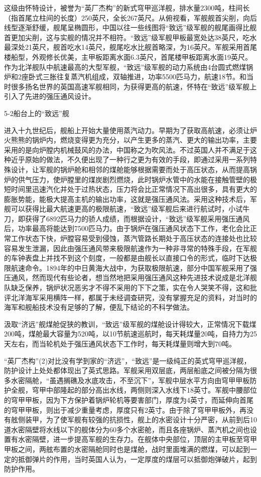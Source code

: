 \documentclass[12pt,UTF8]{ctexbook}
\begin{document}
这级由怀特设计，被誉为“英厂杰构”的新式穹甲巡洋舰，排水量2300吨，柱间长（指首尾立柱间的长度）250英尺，全长267英尺。从俯视看，军舰舰首尖削，向后线型逐渐舒缓，舰尾呈椭圆形，中国以往一些线图将“致远”级军舰的舰尾画得比舰首更加尖削，这与实舰的情况并不相符。“致远”级军舰甲板最宽处达38英尺，吃水最深处21英尺，舰首吃水14英尺，舰尾吃水比舰首略深，为16英尺。军舰采用首尾楼船型，外观修长优美，主甲板距离水面6.3英尺，首尾楼甲板距离水面19英尺。作为北洋舰队中航速最高的大型军舰，“致远”级军舰的动力系统由4台圆式燃煤锅炉和2座卧式三胀往复蒸汽机组成，双轴推进，功率5500匹马力，航速18节。和当时很多扬名世界的英国高速军舰相同，为获得更高的航速，怀特在“致远”级军舰上引入了先进的强压通风设计。

5-2船台上的“致远”舰

进入十九世纪后，舰船上开始大量使用蒸汽动力。早期为了获取高航速，必须让炉火熊熊的锅炉内，燃烧变得更为充分，以产生更多的蒸汽、更大的输出功率，主要采用的是向炉膛内机械鼓风的办法，中国称之为吹风法。不过英国人并不满足于这种近乎原始的做法，不久便出现了一种行之更为有效的手段，即通过采用一系列特殊设计，让军舰的锅炉舱和相邻的煤舱能够根据需要而处于高压状态，从而提高锅炉的供气压力，使炉膛里的煤炭剧烈燃烧，此时锅炉水管中的水能在接触管壁的极短时间里迅速汽化并处于过热状态，压力将会比正常情况下高出很多，具有更大的膨胀势能，能极大提高主机的输出功率，这就是强压通风法。采用这种技术后，军舰可以获得比最大航速更高的极限航速，“致远”级军舰后来进行航试时，小试牛刀，即获得了6892匹马力的骄人成绩，而根据设计，“致远”级军舰采用强压通风后，功率最高将能达到7500匹马力。由于锅炉在强压通风状态下工作，老化会比正常工作状态下快，炉膛容易受到侵蚀，蒸汽管路长期处于高压状态的连接处也比较容易发生泄漏，因此由强压通风带来极限航速作为一种非寻常的特殊手段，在军舰的车钟表盘上并找不到这个刻度，一般都是由舰长以直接口令的形式，临时下达极限航速命令。1894年的中日黄海大战中，为获取极限航速，部分中国军舰采用了强压通风，然而现代有些论者，想当然地把采用强压通风这种先进技术说成是北洋舰队缺乏保养，锅炉状况恶劣才不得不采用的下下之策，实在令人哭笑不得，这和批评北洋海军采用横阵一样，都属于未经调查研究，没有掌握充足的资料，对当时的海军和舰船技术没有足够的了解，便乱下结论的不科学做法。

汲取“济远”舰煤舱促狭的教训，“致远”级军舰的煤舱设计得较大，正常情况下载煤200吨，煤舱最大容量为520吨，以10节航速巡航时，每天耗煤量20吨，自持力为25天左右，而当轮机处于强压通风状态下工作时，每天耗煤量则增大到70吨。

“英厂杰构”(2)对比没有学到家的“济远”，“致远”是一级纯正的英式穹甲巡洋舰，防护设计上处处都体现出了英式思路。军舰采用双层底，两层船底之间被分隔为很多水密隔舱，“虽遇搁礁及水底攻击，不至沉下”，军舰中层水平方向由穹甲甲板防护全舰，穹甲中部隆起的部分高出水线，两侧则深入水线下18英寸。军舰中腰部位的穹甲甲板，因为下方保护着锅炉轮机等要害部门，厚度为4英寸，而延伸向首尾的穹甲甲板，则出于减少重量考虑，厚度只有2英寸。由于除了穹甲甲板外，再没有舷侧装甲，为了使军舰有较强的抗损性，舰上的水密设计十分严密，从前到后10道水密隔壁将水线以下的舰体分为60多个水密舱，而且各座锅炉、蒸汽机之间也设置有水密隔壁，进一步提高军舰的生存力。在舰体中央部位，顶层的主甲板至穹甲甲板之间，两舷布置的水密隔舱同时也是煤舱，战时里面堆满的燃煤，可以起到一定的抵御弹片的作用，当时英国人认为，一定厚度的煤层可以抵御炮弹破片，起到防护作用。
\end{document}
